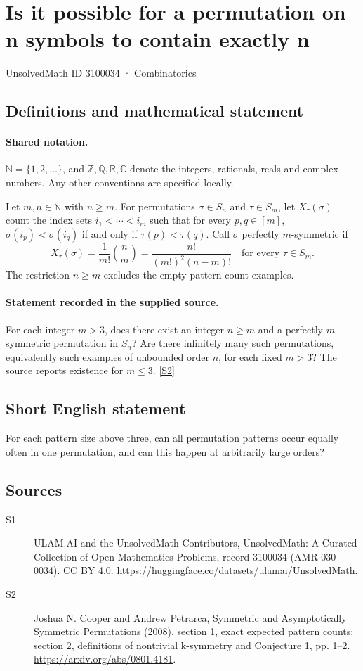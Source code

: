 \documentclass[11pt]{article}
\newcommand{\sref}[2]{\hyperlink{source:#1:#2}{[S#2]}}
\begin{document}
\setcounter{section}{3100033}
\section{Is it possible for a permutation on n symbols to contain exactly n}\label{3100034}
{\small\sffamily UnsolvedMath ID 3100034 · Combinatorics}
\subsection{Definitions and mathematical statement}

\paragraph{Shared notation.}$\mathbb N=\{1,2,\ldots\}$, and $\mathbb Z,\mathbb Q,\mathbb R,\mathbb C$ denote the integers, rationals, reals and complex numbers. Any other conventions are specified locally.


Let $m,n\in\mathbb N$ with $n\geq m$. For permutations $\sigma\in S_n$ and $\tau\in S_m$, let $X_\tau(\sigma)$ count the index sets $i_1<\cdots<i_m$ such that for every $p,q\in[m]$, $\sigma(i_p)<\sigma(i_q)$ if and only if $\tau(p)<\tau(q)$. Call $\sigma$ perfectly $m$-symmetric if
\[X_\tau(\sigma)=\frac1{m!}\binom nm=\frac{n!}{(m!)^2(n-m)!}\quad\text{for every }\tau\in S_m.\]
The restriction $n\geq m$ excludes the empty-pattern-count examples.
\paragraph{Statement recorded in the supplied source.}
For each integer $m>3$, does there exist an integer $n\geq m$ and a perfectly $m$-symmetric permutation in $S_n$? Are there infinitely many such permutations, equivalently such examples of unbounded order $n$, for each fixed $m>3$? The source reports existence for $m\leq3$. \sref{3100034}{2}
\subsection{Short English statement}
For each pattern size above three, can all permutation patterns occur equally often in one permutation, and can this happen at arbitrarily large orders?
\subsection{Sources}
\begin{description}
\item[\hypertarget{source:3100034:1}{S1}] ULAM.AI and the UnsolvedMath Contributors, UnsolvedMath: A Curated Collection of Open Mathematics Problems, record 3100034 (AMR-030-0034). CC BY 4.0. \url{https://huggingface.co/datasets/ulamai/UnsolvedMath}.
\item[\hypertarget{source:3100034:2}{S2}] Joshua N. Cooper and Andrew Petrarca, Symmetric and Asymptotically Symmetric Permutations (2008), section 1, exact expected pattern counts; section 2, definitions of nontrivial k-symmetry and Conjecture 1, pp. 1--2. \url{https://arxiv.org/abs/0801.4181}.
\end{description}
\label{end:3100034}
\end{document}

